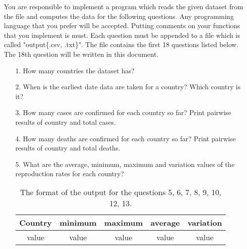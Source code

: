 \documentclass[a4 paper]{article}
\newcommand{\0}{\mathbf{0}}
\begin{document}
You are responsible to implement a program which reads the given dataset from the file and computes the data for the following questions. Any programming language that you prefer will be accepted. Putting comments on your functions that you implement is must. Each question must be appended to a file which is called "output\{.csv, .txt\}". The file contains the first 18 questions listed below. The 18th question will be written in this document.

\begin{itemize}
	\item[1. ] How many countries the dataset has?
	\item[2. ] When is the earliest date data are taken for a country? Which country is it?
	\item[3. ] How many cases are confirmed for each country so far? Print pairwise results of country and total cases.
	\item[4. ] How many deaths are confirmed for each country so far? Print pairwise results of country and total deaths.
	\item[5. ] What are the average, minimum, maximum and variation values of the reproduction rates for each country?
	\begin{table}[ht]
		\caption{The format of the output for the questions 5, 6, 7, 8, 9, 10, 12, 13.} %
		\centering  %
		\begin{tabular}{c c c c c}%
			\hline\hline       %
			Country & minimum & maximum & average & variation \\ 
			[0.5ex]%
			\hline      %
			value & value & value & value & value \\%
			

\end{tabular}
\end{table}
\end{itemize}
\end{document}
